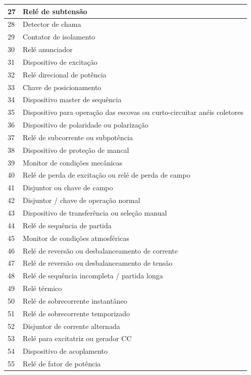 \documentclass[a5paper,english,spanish,brazil]{ufsc-thesis}
\begin{document}
\begin{longtable}{|l|p{}|}
		  27 & Relé de subtensão \\ \hline
		  28 & Detector de chama \\ \hline
		  29 & Contator de isolamento \\ \hline
		  30 & Relé anunciador \\ \hline
		  31 & Dispositivo de excitação  \\ \hline
		  32 & Relé direcional de potência \\ \hline
		  33 & Chave de posicionamento \\ \hline
		  34 & Dispositivo master de sequência \\ \hline
		  35 & Dispositivo para operação das escovas ou curto-circuitar anéis coletores \\ \hline
		  36 & Dispositivo de polaridade ou polarização \\ \hline
		  37 & Relé de subcorrente ou subpotência \\ \hline
		  38 & Dispositivo de proteção de mancal \\ \hline
		  39 & Monitor de condições mecânicas \\ \hline
		  40 & Relé de perda de excitação ou relé de perda de campo \\ \hline
		  41 & Disjuntor ou chave de campo \\ \hline
		  42 & Disjuntor / chave de operação normal \\ \hline
		  43 & Dispositivo de transferência ou seleção manual \\ \hline
		  44 & Relé de sequência de partida  \\ \hline
		  45 & Monitor de condições atmosféricas \\ \hline
		  46 & Relé de reversão ou desbalanceamento de corrente \\ \hline
		  47 & Relé de reversão ou desbalanceamento de tensão \\ \hline
		  48 & Relé de sequência incompleta / partida longa \\ \hline
		  49 & Relé térmico \\ \hline
		  50 & Relé de sobrecorrente instantâneo \\ \hline
		  51 & Relé de sobrecorrente temporizado \\ \hline
		  52 & Disjuntor de corrente alternada \\ \hline
		  53 & Relé para excitatriz ou gerador CC \\ \hline
		  54 & Dispositivo de acoplamento \\ \hline
		  55 & Relé de fator de potência \\ \hline

\end{longtable}
\end{document}
